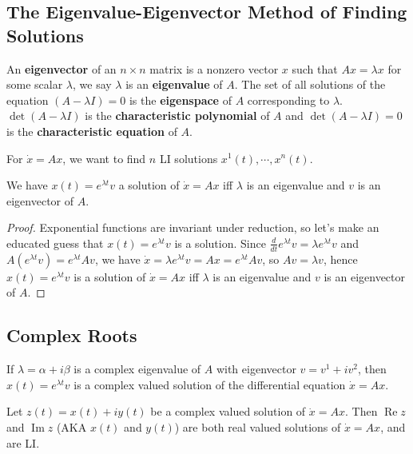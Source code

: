 \subsection{The Eigenvalue-Eigenvector Method of Finding Solutions}
\begin{definition}[Eigenblah]
    An \textbf{eigenvector} of an $n\times n$ matrix is a nonzero vector $x$ such that $Ax=\lambda x$ for some scalar $\lambda$, we say $\lambda$ is an \textbf{eigenvalue} of $A$. The set of all solutions of the equation $(A-\lambda I)=0$ is the \textbf{eigenspace} of $A$ corresponding to $\lambda$. $\det (A-\lambda I)$ is the \textbf{characteristic polynomial} of $A$ and $\det (A-\lambda I)=0$ is the \textbf{characteristic equation} of $A$.
\end{definition}
For $\dot x=Ax$, we want to find $n$ LI solutions $x^1(t),\cdots ,x^n (t)$. 
\begin{theorem}\label{eigen}
    We have $x(t)=e^{\lambda t}v$ a solution of $\dot x=Ax$ iff $\lambda$ is an eigenvalue and $v$ is an eigenvector of $A$.
\end{theorem}
\begin{proof}
    Exponential functions are invariant under reduction, so let's make an educated guess that $x(t)=e^{\lambda t}v$ is a solution. Since $\frac{d}{dt}e^{\lambda t}v=\lambda e^{\lambda t}v$ and $A(e^{\lambda t}v)=e^{\lambda t}Av$, we have $\dot x=\lambda e^{\lambda t}v=Ax=e^{\lambda t}Av$, so $Av=\lambda v$, hence $x(t)=e^{\lambda t}v$ is a solution of $\dot x=Ax$ iff $\lambda$ is an eigenvalue and $v$ is an eigenvector of $A$.
\end{proof}

\subsection{Complex Roots}
If $\lambda=\alpha +i\beta $ is a complex eigenvalue of $A$ with eigenvector $v=v^1+iv^2$, then $x(t)=e^{\lambda t}v$ is a complex valued solution of the differential equation $\dot x=Ax$.
\begin{lemma}\label{complex}
    Let $z(t)=x(t)+iy(t)$ be a complex valued solution of $\dot x=Ax$. Then $\operatorname{Re}z$ and $\operatorname{Im}z$ (AKA $x(t)$ and $y(t)$) are both real valued solutions of $\dot x=Ax$, and are LI.
\end{lemma}

